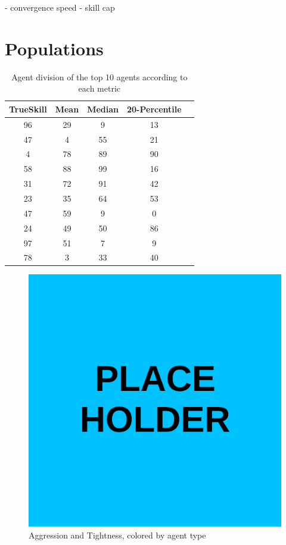\begin{code}
    - convergence speed
    - skill cap
\end{code}

\section{Populations}
\begin{table}[H]
\centering
\begin{tabular}{|| c | c | c | c | c ||} 
 \hline
 TrueSkill & Mean & Median & 20-Percentile \\ [0.5ex] 
 \hline\hline
    96 &    29 &       9 &             13 \\
    47 &     4 &      55 &             21 \\
     4 &    78 &      89 &             90 \\
    58 &    88 &      99 &             16 \\
    31 &    72 &      91 &             42 \\
    23 &    35 &      64 &             53 \\
    47 &    59 &       9 &              0 \\
    24 &    49 &      50 &             86 \\
    97 &    51 &       7 &              9 \\
    78 &     3 &      33 &             40 \\ [1ex] 
 \hline
\end{tabular}
\label{DivisionRankings}
\caption{Agent division of the top 10 agents according to each metric}
\end{table}

\begin{figure}[H]
\centering
    \includegraphics[width=0.8\linewidth]{Results/figures/placeholder.png}
\caption{Aggression and Tightness, colored by agent type}
\label{AggTightAgentType}
\end{figure}

